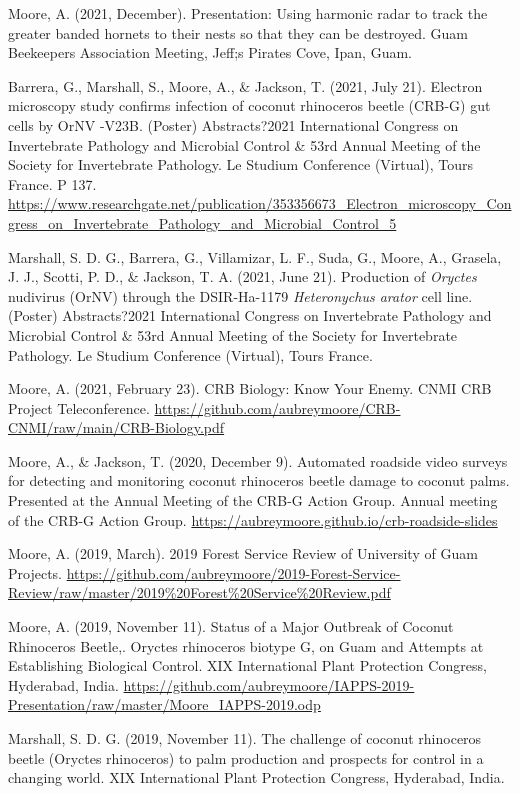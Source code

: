 \documentclass[12pt,english]{simplecv}
\begin{document}
\begin{thebibliography}{999}
\bibitem{} Moore, A. (2021, December). Presentation: Using harmonic radar to track the greater banded hornets to their nests so that they can be destroyed. Guam Beekeepers Association Meeting, Jeff;s Pirates Cove, Ipan, Guam.

\bibitem{} Barrera, G., Marshall, S., Moore, A., \& Jackson, T. (2021, July 21). Electron microscopy study confirms infection of coconut rhinoceros beetle (CRB-G) gut cells by OrNV -V23B. (Poster) Abstracts?2021 International Congress on Invertebrate Pathology and Microbial Control \& 53rd Annual Meeting of the Society for Invertebrate Pathology. Le Studium Conference (Virtual), Tours France. P 137. \url{https://www.researchgate.net/publication/353356673_Electron\_microscopy\_Congress\_on\_Invertebrate\_Pathology\_and\_Microbial\_Control\_5}

\bibitem{} Marshall, S. D. G., Barrera, G., Villamizar, L. F., Suda, G., Moore, A., Grasela, J. J., Scotti, P. D., \& Jackson, T. A. (2021, June 21). Production of \textit{Oryctes} nudivirus (OrNV) through the DSIR-Ha-1179 \textit{Heteronychus arator} cell line. (Poster) Abstracts?2021 International Congress on Invertebrate Pathology and Microbial Control \& 53rd Annual Meeting of the Society for Invertebrate Pathology. Le Studium Conference (Virtual), Tours France.

\bibitem{} Moore, A. (2021, February 23). CRB Biology: Know Your Enemy. CNMI CRB Project Teleconference. \url{https://github.com/aubreymoore/CRB-CNMI/raw/main/CRB-Biology.pdf}

\bibitem{} Moore, A., \& Jackson, T. (2020, December 9). Automated roadside video surveys for detecting and monitoring coconut rhinoceros beetle damage to coconut palms. Presented at the Annual Meeting of the CRB-G Action Group. Annual meeting of the CRB-G Action Group. \url{https://aubreymoore.github.io/crb-roadside-slides}

\bibitem{} Moore, A. (2019, March). 2019 Forest Service Review of University of Guam Projects. \url{https://github.com/aubreymoore/2019-Forest-Service-Review/raw/master/2019%20Forest%20Service%20Review.pdf}

\bibitem{} Moore, A. (2019, November 11). Status of a Major Outbreak of Coconut Rhinoceros Beetle,. Oryctes rhinoceros biotype G, on Guam and Attempts at Establishing Biological Control. XIX International Plant Protection Congress, Hyderabad, India. \url{https://github.com/aubreymoore/IAPPS-2019-Presentation/raw/master/Moore_IAPPS-2019.odp}

\bibitem{} Marshall, S. D. G. (2019, November 11). The challenge of coconut rhinoceros beetle (Oryctes rhinoceros) to palm production and prospects for control in a changing world. XIX International Plant Protection Congress, Hyderabad, India.


\end{thebibliography}
\end{document}
